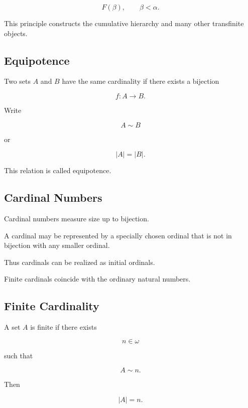 \[
F(\beta),
\qquad
\beta<\alpha.
\]

This principle constructs the cumulative hierarchy and many other
transfinite objects.

\subsection{Equipotence}
\label{subsec:equipotence}

Two sets \(A\) and \(B\) have the same cardinality if there exists a
bijection

\[
f:A\to B.
\]

Write

\[
\boxed{
A\sim B
}
\]

or

\[
\boxed{
|A|=|B|.
}
\]

This relation is called equipotence.

\subsection{Cardinal Numbers}
\label{subsec:cardinal-numbers-set-theory}

Cardinal numbers measure size up to bijection.

A cardinal may be represented by a specially chosen ordinal that is not in
bijection with any smaller ordinal.

Thus cardinals can be realized as initial ordinals.

Finite cardinals coincide with the ordinary natural numbers.

\subsection{Finite Cardinality}
\label{subsec:finite-cardinality-set-theory}

A set \(A\) is finite if there exists

\[
n\in\omega
\]

such that

\[
\boxed{
A\sim n.
}
\]

Then

\[
|A|=n.
\]

